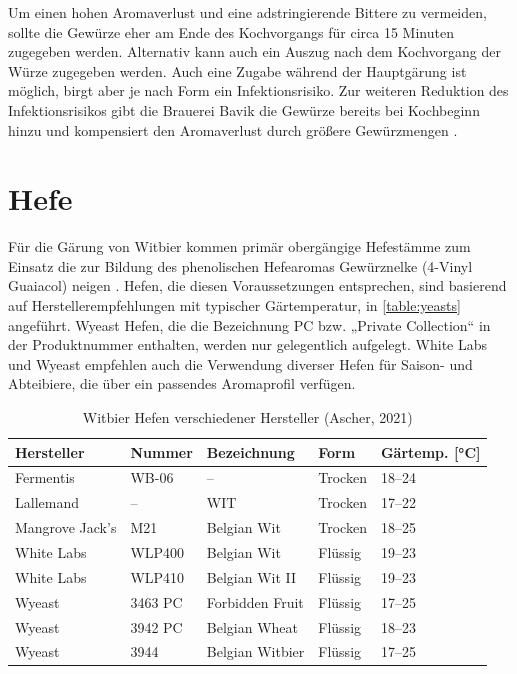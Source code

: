\documentclass[a4paper,parskip=half]{scrartcl}
\begin{document}
Um einen hohen Aromaverlust und eine adstringierende Bittere zu vermeiden,
sollte die Gewürze eher am Ende des Kochvorgangs für circa 15 Minuten
zugegeben werden. Alternativ kann auch ein Auszug nach dem Kochvorgang der
Würze zugegeben werden. Auch eine Zugabe während der Hauptgärung ist möglich,
birgt aber je nach Form ein Infektionsrisiko. \parencite[17\psq]{Strottner1999} 
Zur weiteren Reduktion des Infektionsrisikos gibt die Brauerei
Bavik die Gewürze bereits bei Kochbeginn hinzu und kompensiert den
Aromaverlust durch größere Gewürzmengen \parencite[62]{Hieronymus2010}.

\section*{Hefe}

Für die Gärung von Witbier kommen primär obergängige Hefestämme
zum Einsatz die zur Bildung des phenolischen Hefearomas
Gewürznelke (4-Vinyl Guaiacol) neigen \parencite[46]{Roncoroni2018}.
Hefen, die diesen Voraussetzungen entsprechen, sind
basierend auf Herstellerempfehlungen mit typischer Gärtemperatur,
in \autoref{table:yeasts} angeführt. Wyeast Hefen, die die
Bezeichnung PC bzw. „Private Collection“ in der Produktnummer enthalten,
werden nur gelegentlich aufgelegt. White Labs und Wyeast empfehlen
auch die Verwendung diverser Hefen für Saison- und Abteibiere,
die über ein passendes Aromaprofil verfügen.

\begin{table}[H]
\centering
\begin{tabular}{lllll}
\toprule
Hersteller      & Nummer  & Bezeichnung          & Form    & Gärtemp. [°C] \\
\midrule
Fermentis       & WB-06   & –                    & Trocken & 18–24        \\
Lallemand       & –       & WIT                  & Trocken & 17–22        \\
Mangrove Jack's & M21     & Belgian Wit          & Trocken & 18–25        \\
White Labs      & WLP400  & Belgian Wit          & Flüssig & 19–23        \\
White Labs      & WLP410  & Belgian Wit II       & Flüssig & 19–23        \\
Wyeast          & 3463 PC & Forbidden Fruit      & Flüssig & 17–25        \\
Wyeast          & 3942 PC & Belgian Wheat        & Flüssig & 18–23        \\
Wyeast          & 3944    & Belgian Witbier      & Flüssig & 17–25        \\
\bottomrule
\end{tabular}
\caption{Witbier Hefen verschiedener Hersteller (Ascher, 2021)}
\label{table:yeasts}
\end{table}
\end{document}
